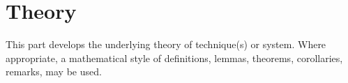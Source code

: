\chapter{Theory}
This part develops the underlying theory of technique(s) or system. Where appropriate, a mathematical style of definitions, lemmas, theorems, corollaries, remarks, may be used.


